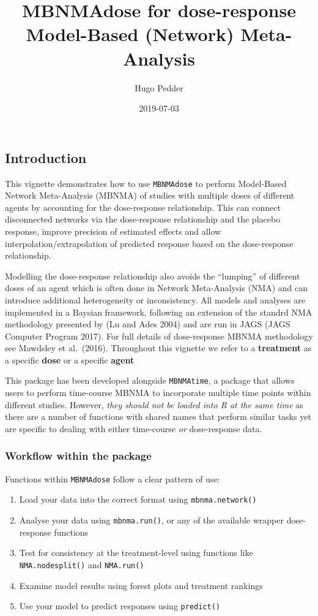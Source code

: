 \documentclass[]{article}
\title{MBNMAdose for dose-response Model-Based (Network) Meta-Analysis}
\author{Hugo Pedder}
\date{2019-07-03}
\providecommand{\tightlist}{%
  \setlength{\itemsep}{0pt}\setlength{\parskip}{0pt}}
\begin{document}
\maketitle

\hypertarget{introduction}{%
\subsection{Introduction}\label{introduction}}

This vignette demonstrates how to use \texttt{MBNMAdose} to perform
Model-Based Network Meta-Analysis (MBNMA) of studies with multiple doses
of different agents by accounting for the dose-response relationship.
This can connect disconnected networks via the dose-response
relationship and the placebo response, improve precision of estimated
effects and allow interpolation/extrapolation of predicted response
based on the dose-response relationship.

Modelling the dose-response relationship also avoids the ``lumping'' of
different doses of an agent which is often done in Network Meta-Analysis
(NMA) and can introduce additional heterogeneity or inconsistency. All
models and analyses are implemented in a Baysian framework, following an
extension of the standrd NMA methodology presented by (Lu and Ades 2004)
and are run in JAGS (JAGS Computer Program 2017). For full details of
dose-response MBNMA methodology see Mawdsley et al.~(2016). Throughout
this vignette we refer to a \textbf{treatment} as a specific
\textbf{dose} or a specific \textbf{agent}

This package has been developed alongside \texttt{MBNMAtime}, a package
that allows users to perform time-course MBNMA to incorporate multiple
time points within different studies. However, \emph{they should not be
loaded into R at the same time} as there are a number of functions with
shared names that perform similar tasks yet are specific to dealing with
either time-course \emph{or} dose-response data.

\hypertarget{workflow-within-the-package}{%
\subsubsection{Workflow within the
package}\label{workflow-within-the-package}}

Functions within \texttt{MBNMAdose} follow a clear pattern of use:

\begin{enumerate}
\def\labelenumi{\arabic{enumi}.}
\tightlist
\item
  Load your data into the correct format using \texttt{mbnma.network()}
\item
  Analyse your data using \texttt{mbnma.run()}, or any of the available
  wrapper dose-response functions
\item
  Test for consistency at the treatment-level using functions like
  \texttt{NMA.nodesplit()} and \texttt{NMA.run()}
\item
  Examine model results using forest plots and treatment rankings
\item
  Use your model to predict responses using \texttt{predict()}
\end{enumerate}
\end{document}
